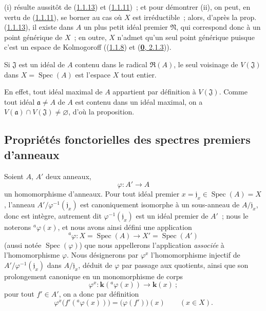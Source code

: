 (i) résulte aussitôt de (\hyperref[I.1.1.13-fr]{1.1.13}) et
(\hyperref[I.1.1.11-fr]{1.1.11})~; et pour démontrer (ii), on peut, en vertu de
(\hyperref[I.1.1.11-fr]{1.1.11}), se borner au cas où $X$ est irréductible~;
alors, d'après la prop. (\hyperref[I.1.1.13-fr]{1.1.13}), il existe dans $A$
un plus petit idéal premier $\mathfrak{N}$, qui correspond donc à un point
générique
de $X$~; en outre, $X$ n'admet qu'un seul point générique puisque c'est un
espace de Kolmogoroff ((\hyperref[I.1.1.8-fr]{1.1.8}) et
(\hyperref[0.2.1.3-fr]{\textbf{0}, 2.1.3})).

\begin{proposition}[1.1.15]
\label{I.1.1.15-fr}
Si $\mathfrak{J}$ est un idéal de $A$ contenu dans le radical
$\mathfrak{R}(A)$, le seul voisinage de $V(\mathfrak{J})$ dans
$X=\operatorname{Spec}(A)$ est l'espace $X$ tout entier.
\end{proposition}

En effet, tout idéal maximal de $A$ appartient par définition à
$V(\mathfrak{J})$. Comme tout idéal $\mathfrak{a}\neq A$ de $A$ est contenu dans un
idéal maximal, on a $V(\mathfrak{a})\cap V(\mathfrak{J})\neq\varnothing$,
d'où la proposition.

\subsection{Propriétés fonctorielles des spectres premiers d'anneaux}
\label{subsection:I.1.2-fr}

\begin{env}[1.2.1]
\label{I.1.2.1-fr}
Soient $A$, $A'$ deux anneaux,
\[
  \varphi:A'\longrightarrow A
\]
un homomorphisme d'anneaux. Pour tout idéal premier
$x=\mathfrak{j}_x\in\operatorname{Spec}(A)=X$, l'anneau
$A'/\varphi^{-1}(\mathfrak{j}_x)$ est canoniquement isomorphe à un
sous-anneau de $A/\mathfrak{j}_x$, donc est intègre, autrement dit
$\varphi^{-1}(\mathfrak{j}_x)$ est un idéal premier de $A'$~; nous le
noterons ${}^a\varphi(x)$, et nous avons ainsi défini une application
\[
  {}^a\varphi:X=\operatorname{Spec}(A)\longrightarrow
  X'=\operatorname{Spec}(A')
\]
(aussi notée $\operatorname{Spec}(\varphi)$) que nous appellerons
l'application \emph{associée} à l'homomorphisme $\varphi$. Nous désignerons par
$\varphi^x$ l'homomorphisme injectif de
$A'/\varphi^{-1}(\mathfrak{j}_x)$ dans $A/\mathfrak{j}_x$, déduit de
$\varphi$ par passage aux quotients, ainsi que son prolongement canonique en
un monomorphisme de corps
\[
  \varphi^x:\boldsymbol{k}({}^a\varphi(x))\longrightarrow\boldsymbol{k}(x)~;
\]
pour tout $f'\in A'$, on a donc par définition
\begin{equation}
  \varphi^x\bigl(f'({}^a\varphi(x))\bigr)=\bigl(\varphi(f')\bigr)(x)
  \qquad(x\in X).
  \tag{1.2.1.1}\label{I.1.2.1.1-fr}
\end{equation}
\end{env}

